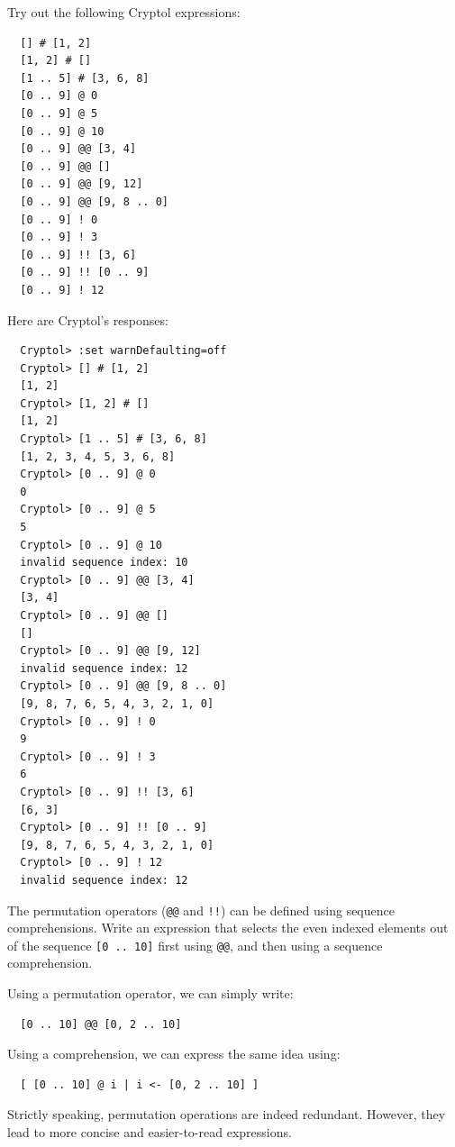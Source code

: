 \begin{Exercise}\label{ex:seq:7}
Try out the following Cryptol expressions:
\begin{Verbatim}
  [] # [1, 2]
  [1, 2] # []
  [1 .. 5] # [3, 6, 8]
  [0 .. 9] @ 0
  [0 .. 9] @ 5
  [0 .. 9] @ 10
  [0 .. 9] @@ [3, 4]
  [0 .. 9] @@ []
  [0 .. 9] @@ [9, 12]
  [0 .. 9] @@ [9, 8 .. 0]
  [0 .. 9] ! 0
  [0 .. 9] ! 3
  [0 .. 9] !! [3, 6]
  [0 .. 9] !! [0 .. 9]
  [0 .. 9] ! 12
\end{Verbatim}
\end{Exercise}
\begin{Answer}
Here are Cryptol's responses:
\begin{Verbatim}
  Cryptol> :set warnDefaulting=off
  Cryptol> [] # [1, 2]
  [1, 2]
  Cryptol> [1, 2] # []
  [1, 2]
  Cryptol> [1 .. 5] # [3, 6, 8]
  [1, 2, 3, 4, 5, 3, 6, 8]
  Cryptol> [0 .. 9] @ 0
  0
  Cryptol> [0 .. 9] @ 5
  5
  Cryptol> [0 .. 9] @ 10
  invalid sequence index: 10
  Cryptol> [0 .. 9] @@ [3, 4]
  [3, 4]
  Cryptol> [0 .. 9] @@ []
  []
  Cryptol> [0 .. 9] @@ [9, 12]
  invalid sequence index: 12
  Cryptol> [0 .. 9] @@ [9, 8 .. 0]
  [9, 8, 7, 6, 5, 4, 3, 2, 1, 0]
  Cryptol> [0 .. 9] ! 0
  9
  Cryptol> [0 .. 9] ! 3
  6
  Cryptol> [0 .. 9] !! [3, 6]
  [6, 3]
  Cryptol> [0 .. 9] !! [0 .. 9]
  [9, 8, 7, 6, 5, 4, 3, 2, 1, 0]
  Cryptol> [0 .. 9] ! 12
  invalid sequence index: 12
\end{Verbatim}
\end{Answer}

\begin{Exercise}\label{ex:seq:8}
  The permutation operators ({\tt @@} and {\tt !!}) can be defined
  using sequence comprehensions.  Write an expression that selects the
  even indexed elements out of the sequence {\tt [0 .. 10]} first
  using {\tt @@}, and then using a sequence comprehension.
\end{Exercise}
\begin{Answer}
Using a permutation operator, we can simply write:
\begin{Verbatim}
  [0 .. 10] @@ [0, 2 .. 10]
\end{Verbatim}
Using a comprehension, we can express the same idea using:
\begin{Verbatim}
  [ [0 .. 10] @ i | i <- [0, 2 .. 10] ]
\end{Verbatim}
Strictly speaking, permutation operations are indeed redundant. 
However, they lead to more concise and easier-to-read expressions.
\end{Answer}


